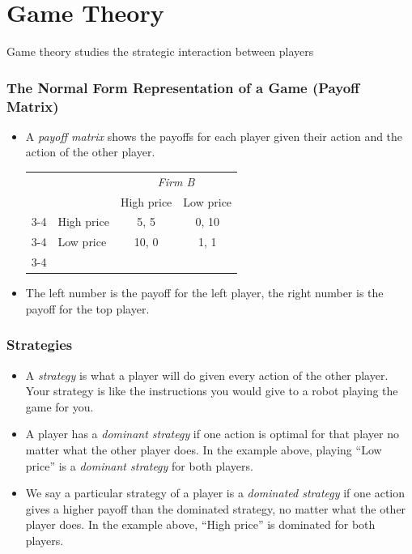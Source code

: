 \documentclass{article}
\begin{document}
\section{Game Theory}
Game theory studies the strategic interaction between players
\subsubsection*{The Normal Form Representation of a Game (Payoff Matrix)}
\begin{itemize}
  \item A \emph{payoff matrix} shows the payoffs for each player given their
    action and the action of the other player.
    \begin{center}
      \begin{tabular}{llcc}
        & & \multicolumn{2}{c}{\emph{Firm B}} \\
        & & High price & Low price \\ \cline{3-4}
        \multirow{2}{*}{\emph{Firm A}} & High price & \multicolumn{1}{|c|}{5, 5} & \multicolumn{1}{c|}{0, 10} \\ \cline{3-4}
        & Low price & \multicolumn{1}{|c|}{10, 0} & \multicolumn{1}{c|}{1, 1} \\ \cline{3-4}
      \end{tabular}
    \end{center}
  \item The left number is the payoff for the left player, the right number is the payoff for the top player.
\end{itemize}
\subsubsection*{Strategies}
\begin{itemize}
  \item A \emph{strategy} is what a player will do given every action of the other player. Your strategy is like the instructions you would give to a robot playing the game for you.
   \item A player has a \emph{dominant strategy} if one action is optimal for
     that player no matter what the other player does. In the example above, playing ``Low price'' is a \emph{dominant strategy} for both players.
  \item We say a particular strategy of a player is a \emph{dominated strategy}
    if one action gives a higher payoff than the dominated strategy, no matter
    what the other player does. In the example above, ``High price'' is dominated for both players.
\end{itemize}
\end{document}
